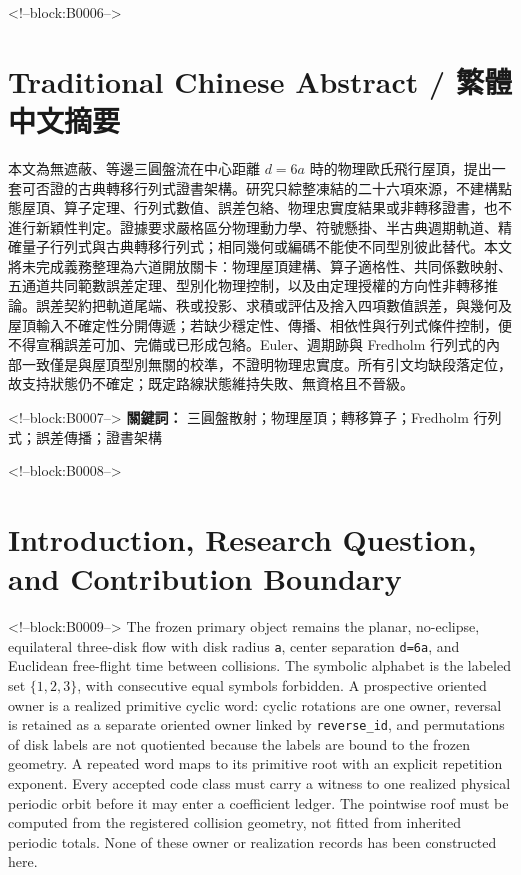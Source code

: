 \documentclass[11pt,a4paper]{article}
\begin{document}
<!--block:B0006-->
\begin{otherlanguage}{chinese-traditional}
\section*{Traditional Chinese Abstract / 繁體中文摘要}
本文為無遮蔽、等邊三圓盤流在中心距離 \(d=6a\) 時的物理歐氏飛行屋頂，提出一套可否證的古典轉移行列式證書架構。研究只綜整凍結的二十六項來源，不建構點態屋頂、算子定理、行列式數值、誤差包絡、物理忠實度結果或非轉移證書，也不進行新穎性判定。證據要求嚴格區分物理動力學、符號懸掛、半古典週期軌道、精確量子行列式與古典轉移行列式；相同幾何或編碼不能使不同型別彼此替代。本文將未完成義務整理為六道開放關卡：物理屋頂建構、算子適格性、共同係數映射、五通道共同範數誤差定理、型別化物理控制，以及由定理授權的方向性非轉移推論。誤差契約把軌道尾端、秩或投影、求積或評估及捨入四項數值誤差，與幾何及屋頂輸入不確定性分開傳遞；若缺少穩定性、傳播、相依性與行列式條件控制，便不得宣稱誤差可加、完備或已形成包絡。Euler、週期跡與 Fredholm 行列式的內部一致僅是與屋頂型別無關的校準，不證明物理忠實度。所有引文均缺段落定位，故支持狀態仍不確定；既定路線狀態維持失敗、無資格且不晉級。

<!--block:B0007-->
\noindent\textbf{關鍵詞：} 三圓盤散射；物理屋頂；轉移算子；Fredholm 行列式；誤差傳播；證書架構
\end{otherlanguage}

<!--block:B0008-->
\section{Introduction, Research Question, and Contribution Boundary}

<!--block:B0009-->
The frozen primary object remains the planar, no-eclipse, equilateral three-disk flow with disk radius \texttt{a}, center separation \texttt{d=6a}, and Euclidean free-flight time between collisions. The symbolic alphabet is the labeled set \(\{1,2,3\}\), with consecutive equal symbols forbidden. A prospective oriented owner is a realized primitive cyclic word: cyclic rotations are one owner, reversal is retained as a separate oriented owner linked by \texttt{reverse\_id}, and permutations of disk labels are not quotiented because the labels are bound to the frozen geometry. A repeated word maps to its primitive root with an explicit repetition exponent. Every accepted code class must carry a witness to one realized physical periodic orbit before it may enter a coefficient ledger. The pointwise roof must be computed from the registered collision geometry, not fitted from inherited periodic totals. None of these owner or realization records has been constructed here.
\end{document}
